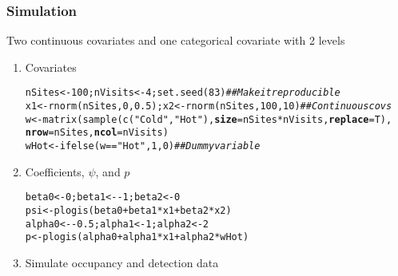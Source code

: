 \documentclass[color=usenames,dvipsnames]{beamer}\usepackage[]{graphicx}\usepackage[]{color}
\makeatletter
\newcommand{\hlnum}[1]{\textcolor[rgb]{0.69,0.494,0}{#1}}%
\newcommand{\hlstr}[1]{\textcolor[rgb]{0.749,0.012,0.012}{#1}}%
\newcommand{\hlcom}[1]{\textcolor[rgb]{0.514,0.506,0.514}{\textit{#1}}}%
\newcommand{\hlopt}[1]{\textcolor[rgb]{0,0,0}{#1}}%
\newcommand{\hlstd}[1]{\textcolor[rgb]{0,0,0}{#1}}%
\newcommand{\hlkwb}[1]{\textcolor[rgb]{0,0.341,0.682}{#1}}%
\newcommand{\hlkwc}[1]{\textcolor[rgb]{0,0,0}{\textbf{#1}}}%
\newcommand{\hlkwd}[1]{\textcolor[rgb]{0.004,0.004,0.506}{#1}}%
\newenvironment{kframe}{%
 \def\at@end@of@kframe{}%
 \ifinner\ifhmode%
  \def\at@end@of@kframe{\end{minipage}}%
  \begin{minipage}{\columnwidth}%
 \fi\fi%
 \def\FrameCommand##1{\hskip\@totalleftmargin \hskip-\fboxsep
 \colorbox{shadecolor}{##1}\hskip-\fboxsep
     \hskip-\linewidth \hskip-\@totalleftmargin \hskip\columnwidth}%
 \MakeFramed {\advance\hsize-\width
   \@totalleftmargin\z@ \linewidth\hsize
   \@setminipage}}%
 {\par\unskip\endMakeFramed%
 \at@end@of@kframe}
\newenvironment{knitrout}{}{} %
\makeatother
\begin{document}
\begin{frame}[fragile]
  \frametitle{Simulation}
  \small
  Two continuous covariates and one categorical covariate with 2 levels
  \vfill
  \begin{enumerate}[<+->]
  \item Covariates
\begin{knitrout}\scriptsize
{}\color{fgcolor}\begin{kframe}
\begin{alltt}
\hlstd{nSites} \hlkwb{<-} \hlnum{100}\hlstd{; nVisits} \hlkwb{<-} \hlnum{4}\hlstd{;} \hlkwd{set.seed}\hlstd{(}\hlnum{83}\hlstd{)} \hlcom{## Make it reproducible}
\hlstd{x1} \hlkwb{<-} \hlkwd{rnorm}\hlstd{(nSites,}\hlnum{0}\hlstd{,}\hlnum{0.5}\hlstd{); x2} \hlkwb{<-} \hlkwd{rnorm}\hlstd{(nSites,}\hlnum{100}\hlstd{,}\hlnum{10}\hlstd{)} \hlcom{## Continuous covs}
\hlstd{w} \hlkwb{<-} \hlkwd{matrix}\hlstd{(}\hlkwd{sample}\hlstd{(}\hlkwd{c}\hlstd{(}\hlstr{"Cold"}\hlstd{,} \hlstr{"Hot"}\hlstd{),} \hlkwc{size}\hlstd{=nSites}\hlopt{*}\hlstd{nVisits,} \hlkwc{replace}\hlstd{=T),}
            \hlkwc{nrow}\hlstd{=nSites,} \hlkwc{ncol}\hlstd{=nVisits)}
\hlstd{wHot} \hlkwb{<-} \hlkwd{ifelse}\hlstd{(w}\hlopt{==}\hlstr{"Hot"}\hlstd{,} \hlnum{1}\hlstd{,} \hlnum{0}\hlstd{)}              \hlcom{## Dummy variable}
\end{alltt}
\end{kframe}
\end{knitrout}
  \item Coefficients, $\psi$, and $p$
\begin{knitrout}\scriptsize
{}\color{fgcolor}\begin{kframe}
\begin{alltt}
\hlstd{beta0} \hlkwb{<-} \hlnum{0}\hlstd{; beta1} \hlkwb{<-} \hlopt{-}\hlnum{1}\hlstd{; beta2} \hlkwb{<-} \hlnum{0}
\hlstd{psi} \hlkwb{<-} \hlkwd{plogis}\hlstd{(beta0} \hlopt{+} \hlstd{beta1}\hlopt{*}\hlstd{x1} \hlopt{+} \hlstd{beta2}\hlopt{*}\hlstd{x2)}
\hlstd{alpha0} \hlkwb{<-} \hlopt{-}\hlnum{0.5}\hlstd{; alpha1} \hlkwb{<-} \hlnum{1}\hlstd{; alpha2} \hlkwb{<-} \hlnum{2}
\hlstd{p} \hlkwb{<-} \hlkwd{plogis}\hlstd{(alpha0} \hlopt{+} \hlstd{alpha1}\hlopt{*}\hlstd{x1} \hlopt{+} \hlstd{alpha2}\hlopt{*}\hlstd{wHot)}
\end{alltt}
\end{kframe}
\end{knitrout}
  \item Simulate occupancy and detection data
\begin{knitrout}\scriptsize

\end{knitrout}
\end{enumerate}
\end{frame}
\end{document}
